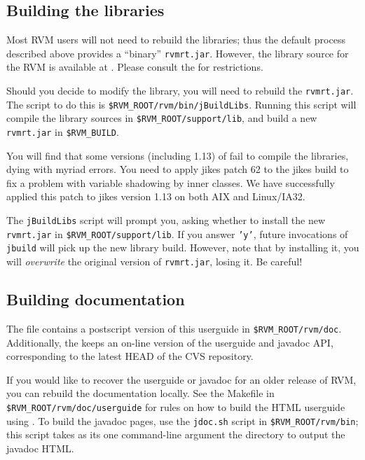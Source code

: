 \subsection{Building the libraries}

Most RVM users will not need to rebuild the libraries; thus the default
process described above provides a ``binary'' {\tt rvmrt.jar}.  However,
the library source for the RVM is available at
\xlink{{\tt \RVMDownloadURL}}{\RVMDownloadURL}.  
Please consult the 
 for restrictions.  

Should you decide to modify the library, you will need to rebuild the 
{\tt rvmrt.jar}.  The script to do this is
{\tt \$RVM\_ROOT/rvm/bin/jBuildLibs}.  Running this script will compile the
library sources in {\tt \$RVM\_ROOT/support/lib}, and build a new {\tt
rvmrt.jar} in {\tt \$RVM\_BUILD}.

You will find that some versions (including 1.13) of 
 fail to compile the
libraries, dying with myriad errors.  You need to apply jikes 
patch 62 to
the jikes build to fix a problem with variable shadowing by inner classes. 
We have
successfully applied this patch to jikes version 1.13 on both AIX and
Linux/IA32.

The {\tt jBuildLibs} script will prompt you, asking whether to install 
the new {\tt rvmrt.jar} in {\tt \$RVM\_ROOT/support/lib}.  
If you answer {\tt 'y'}, future invocations of {\tt jbuild} will pick up
the new library build.  However, note that by installing it, you will
{\em overwrite} the original version of {\tt rvmrt.jar}, losing it.  Be
careful!

\subsection{Building documentation}

The {\tt \RVMTarFile} file contains a postscript version of this userguide
in {\tt \$RVM\_ROOT/rvm/doc}.  Additionally, the 
 keeps an on-line version of
the userguide and javadoc API, corresponding to the latest HEAD of the CVS
repository.

If you would like to recover the userguide or javadoc for an older release
of RVM, you can rebuild the documentation locally.  See the Makefile in
{\tt \$RVM\_ROOT/rvm/doc/userguide} for rules on how to build the
HTML userguide using
.  To build the javadoc pages, use
the {\tt jdoc.sh} script in {\tt \$RVM\_ROOT/rvm/bin}; this script takes as
its one command-line argument the directory to output the javadoc HTML.

